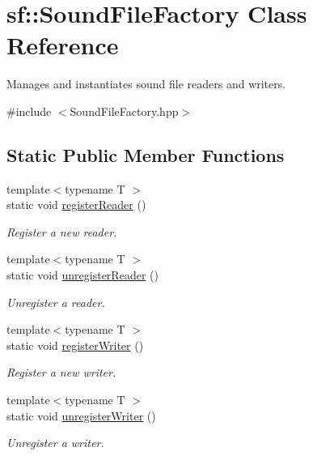 \hypertarget{classsf_1_1_sound_file_factory}{\section{sf\-:\-:Sound\-File\-Factory Class Reference}
\label{classsf_1_1_sound_file_factory}
}


Manages and instantiates sound file readers and writers.  




{\ttfamily \#include $<$Sound\-File\-Factory.\-hpp$>$}

\subsection*{Static Public Member Functions}
\begin{DoxyCompactItemize}
\item 
{\footnotesize template$<$typename T $>$ }\\static void \hyperlink{classsf_1_1_sound_file_factory_acaf1f0bf1b7c7b9988ec76b33e33fe95}{register\-Reader} ()
\begin{DoxyCompactList}\small\item\em Register a new reader. \end{DoxyCompactList}\item 
{\footnotesize template$<$typename T $>$ }\\static void \hyperlink{classsf_1_1_sound_file_factory_a9e6765c41e2784bc755388afb4a2f432}{unregister\-Reader} ()
\begin{DoxyCompactList}\small\item\em Unregister a reader. \end{DoxyCompactList}\item 
{\footnotesize template$<$typename T $>$ }\\static void \hyperlink{classsf_1_1_sound_file_factory_a3a59140e6ccf1f252f721b790eddd661}{register\-Writer} ()
\begin{DoxyCompactList}\small\item\em Register a new writer. \end{DoxyCompactList}\item 
{\footnotesize template$<$typename T $>$ }\\static void \hyperlink{classsf_1_1_sound_file_factory_a2306f90d1f72e474732e4bcceeb34215}{unregister\-Writer} ()
\begin{DoxyCompactList}\small\item\em Unregister a writer. \end{DoxyCompactList}\item 

\end{DoxyCompactItemize}
